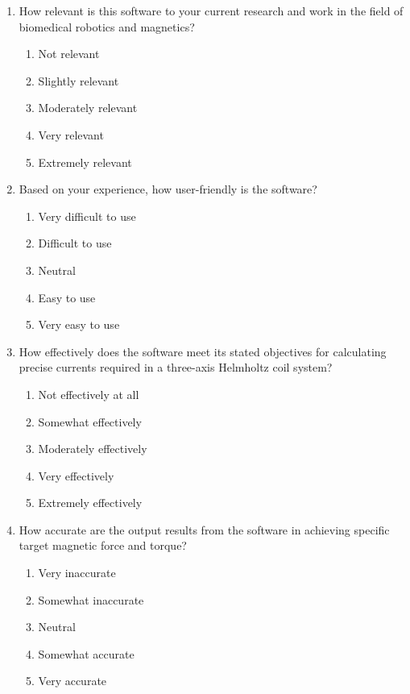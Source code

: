 \documentclass[12pt, titlepage]{article}
\begin{document}
\begin{enumerate}
\item How relevant is this software to your current research and work in the field of biomedical robotics and magnetics?
\begin{enumerate}
    \item Not relevant
    \item Slightly relevant
    \item Moderately relevant
    \item Very relevant
    \item Extremely relevant
\end{enumerate}

\item Based on your experience, how user-friendly is the software?
\begin{enumerate}
    \item Very difficult to use
    \item Difficult to use
    \item Neutral
    \item Easy to use
    \item Very easy to use
\end{enumerate}

\item How effectively does the software meet its stated objectives for calculating precise currents required in a three-axis Helmholtz coil system?
\begin{enumerate}
    \item Not effectively at all
    \item Somewhat effectively
    \item Moderately effectively
    \item Very effectively
    \item Extremely effectively
\end{enumerate}

\item How accurate are the output results from the software in achieving specific target magnetic force and torque?
\begin{enumerate}
    \item Very inaccurate
    \item Somewhat inaccurate
    \item Neutral
    \item Somewhat accurate
    \item Very accurate
\end{enumerate}


\end{enumerate}
\end{document}
